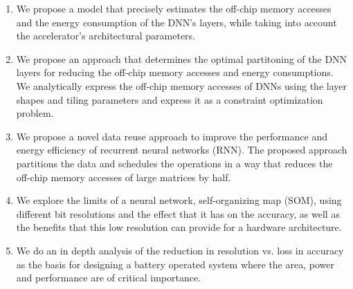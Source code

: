 \documentclass[a4paper,10pt]{article}
\begin{document}
\begin{enumerate}
	\item We propose a model that precisely estimates the off-chip memory accesses and the energy consumption of the DNN's layers, while taking into account the accelerator's architectural parameters.
	\item We propose an approach that determines the optimal partitoning of the DNN layers for reducing the off-chip memory accesses and energy consumptions. We analytically express the off-chip memory accesses of DNNs  using the layer shapes and tiling parameters and express it as a constraint optimization problem.
	\item We propose a novel data reuse approach to improve the performance and energy efficiency of recurrent neural networks (RNN). The proposed approach partitions the data and schedules the operations in a way that reduces the off-chip memory accesses of large matrices by half.
	\item We explore the limits of a neural network, self-organizing map (SOM), using different bit resolutions and the effect that it has on the accuracy, as well as the benefits that this low resolution can provide for a hardware architecture. 
	\item We do an in depth analysis of the reduction in resolution vs. loss in accuracy as the basis for designing a battery operated system where the area, power and performance are of critical importance.
\end{enumerate}
\end{document}
